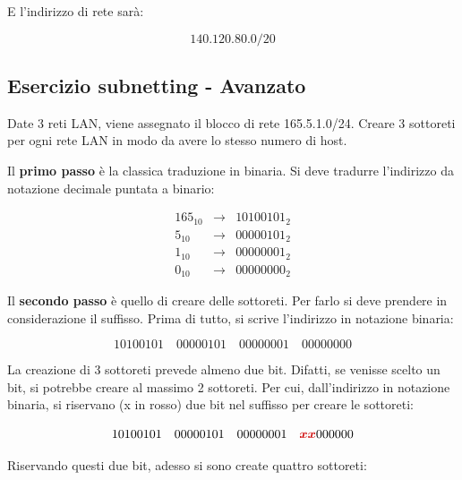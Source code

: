 \documentclass[a4paper]{article}
\newcommand{\binaryaddress}[4]{#1 \hspace{1em} #2 \hspace{1em} #3 \hspace{1em} #4}
\begin{document}
	\noindent
	E l'indirizzo di rete sarà:
	
	\begin{equation*}
		140.120.80.0/20
	\end{equation*}

	\newpage
	
	\subsection{\textcolor{Red3}{Esercizio subnetting - Avanzato}}
	
	Date 3 reti LAN, viene assegnato il blocco di rete 165.5.1.0/24. Creare 3 sottoreti per ogni rete LAN in modo da avere lo stesso numero di host.\newline
	
	Il \textbf{primo passo} è la classica traduzione in binaria. Si deve tradurre l’indirizzo da notazione decimale puntata a binario:
	
	\begin{equation*}
		\begin{array}{lll}
			165_{10}	& \longrightarrow & 10100101_{2} \\
			5_{10}		& \longrightarrow & 00000101_{2} \\
			1_{10}		& \longrightarrow & 00000001_{2} \\
			0_{10}		& \longrightarrow & 00000000_{2}
		\end{array}
	\end{equation*}

	\noindent
	Il \textbf{secondo passo} è quello di creare delle sottoreti. Per farlo si deve prendere in considerazione il suffisso. Prima di tutto, si scrive l’indirizzo in notazione binaria:
	
	\begin{equation*}
		\binaryaddress{10100101}{00000101}{00000001}{00000000}
	\end{equation*}

	\noindent
	La creazione di 3 sottoreti prevede almeno due bit. Difatti, se venisse scelto un bit, si potrebbe creare al massimo 2 sottoreti. Per cui, dall’indirizzo in notazione binaria, si riservano (x in rosso) due bit nel suffisso per creare le sottoreti:
	
	\begin{equation*}
		\binaryaddress{10100101}{00000101}{00000001}{\textcolor{Red3}{\boldsymbol{xx}}000000}
	\end{equation*}

	\noindent
	Riservando questi due bit, adesso si sono create quattro sottoreti:
	
\end{document}
